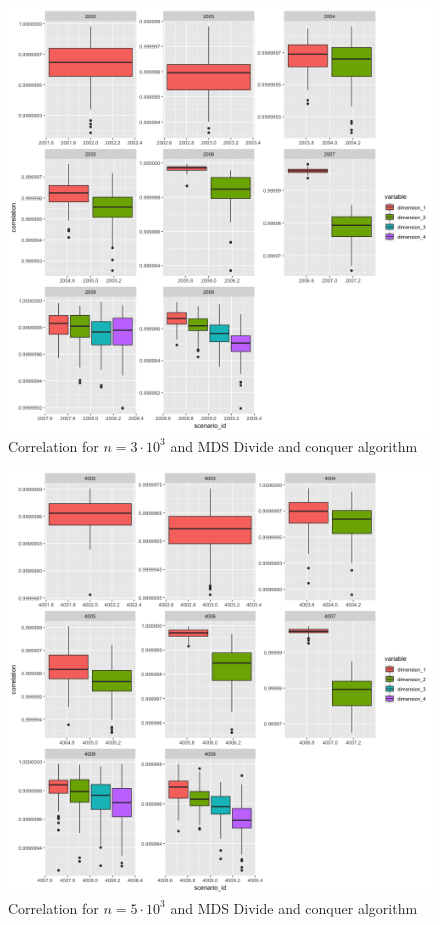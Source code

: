 \documentclass[11pt]{report}
\begin{document}
\begin{figure}[ht]
\centering
    \includegraphics[scale = 1.5]{./images/divide_correlation_3000.png}
    \caption{Correlation for $n = 3 \cdot 10^3$ and MDS Divide and conquer algorithm}
    \label{divide_correlation_3000}
\end{figure}

\begin{figure}[ht]
\centering
    \includegraphics[scale = 1.5]{./images/divide_correlation_5000.png}
    \caption{Correlation for $n = 5 \cdot 10^3$ and MDS Divide and conquer algorithm}
    \label{divide_correlation_5000}
\end{figure}
\end{document}
